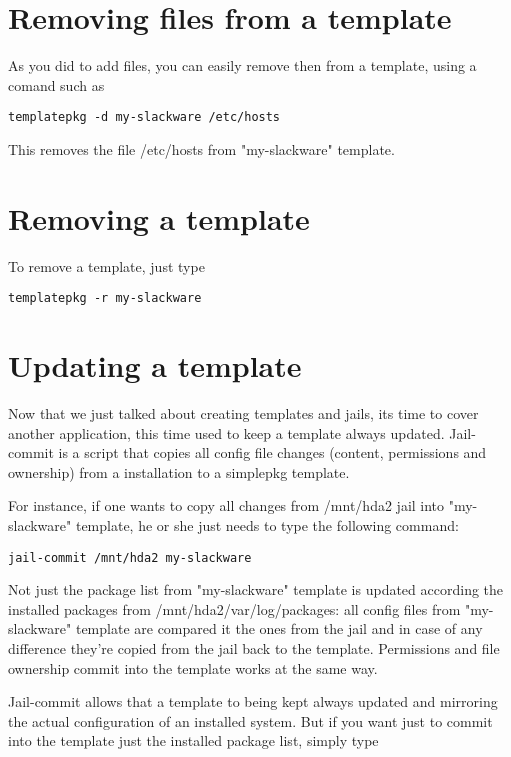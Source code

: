 \documentclass{article}
\begin{document}
\section{Removing files from a template}

As you did to add files, you can easily remove then from a template, using a comand such as

\begin{verbatim}
templatepkg -d my-slackware /etc/hosts
\end{verbatim}

This removes the file /etc/hosts from "my-slackware" template.

\section{Removing a template}

To remove a template, just type

\begin{verbatim}
templatepkg -r my-slackware
\end{verbatim}

\section{Updating a template}

Now that we just talked about creating templates and jails, its time to cover another application, this time used to keep a template always updated. Jail-commit is a script that copies all config file changes (content, permissions and ownership) from a installation to a simplepkg template.

For instance, if one wants to copy all changes from /mnt/hda2 jail into "my-slackware" template, he or she just needs to type the following command:

\begin{verbatim}
jail-commit /mnt/hda2 my-slackware
\end{verbatim}

Not just the package list from "my-slackware" template is updated according the installed packages from /mnt/hda2/var/log/packages: all config files from "my-slackware" template are compared it the ones from the jail and in case of any difference they're copied from the jail back to the template. Permissions and file ownership commit into the template works at the same way.

Jail-commit allows that a template to being kept always updated and mirroring the actual configuration of an installed system. But if you want just to commit into the template just the installed package list, simply type
\end{document}
